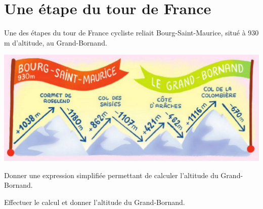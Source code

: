 \section{Une étape du tour de France}

Une des étapes du tour de France cycliste reliait Bourg-Saint-Maurice, situé à 930 m d'altitude, au Grand-Bornand.

\begin{center}
	\includegraphics[scale=0.5]{img/etape}
\end{center}

\begin{questions}
\question Donner une expression simplifiée permettant de calculer l'altitude du Grand-Bornand.

\question Effectuer le calcul et donner l'altitude du Grand-Bornand.	
\end{questions}